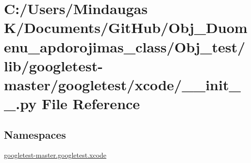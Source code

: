\hypertarget{_obj__test_2lib_2googletest-master_2googletest_2xcode_2____init_____8py}{}\section{C\+:/\+Users/\+Mindaugas K/\+Documents/\+Git\+Hub/\+Obj\+\_\+\+Duomenu\+\_\+apdorojimas\+\_\+class/\+Obj\+\_\+test/lib/googletest-\/master/googletest/xcode/\+\_\+\+\_\+init\+\_\+\+\_\+.py File Reference}
\label{_obj__test_2lib_2googletest-master_2googletest_2xcode_2____init_____8py}
\subsection*{Namespaces}
\begin{DoxyCompactItemize}
\item 
 \mbox{\hyperlink{namespacegoogletest-master_1_1googletest_1_1xcode}{googletest-\/master.\+googletest.\+xcode}}
\end{DoxyCompactItemize}
